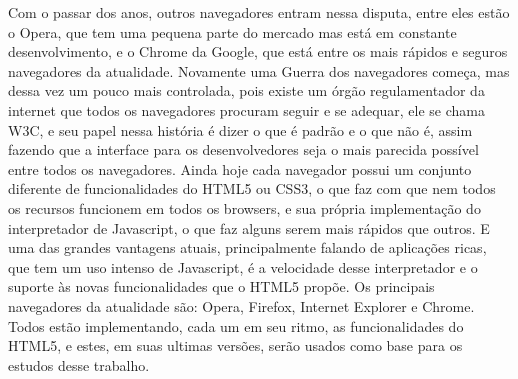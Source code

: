 Com o passar dos anos, outros navegadores entram nessa disputa, entre
eles estão o Opera, que tem uma pequena parte do mercado mas está em
constante desenvolvimento, e o Chrome da Google, que está entre os
mais rápidos e seguros navegadores da atualidade.
Novamente uma Guerra dos navegadores começa, mas dessa vez um pouco
mais controlada, pois existe um órgão regulamentador da internet que
todos os navegadores procuram seguir e se adequar, ele se chama W3C,
e seu papel nessa história é dizer o que
é padrão e o que não é, assim fazendo que a interface para os
desenvolvedores seja o mais parecida possível entre todos os
navegadores.
Ainda hoje cada navegador possui um conjunto diferente de funcionalidades
do HTML5 ou CSS3, o que faz com que nem todos os recursos funcionem em todos
os browsers, e sua própria implementação do
interpretador de Javascript, o que faz alguns serem mais rápidos que
outros. E uma das grandes vantagens atuais, principalmente falando de
aplicações ricas, que tem um uso intenso de Javascript, é a velocidade
desse interpretador e o suporte às novas funcionalidades que o HTML5
propõe.
Os principais navegadores da atualidade são: Opera, Firefox, Internet
Explorer e Chrome. Todos estão implementando, cada um em seu ritmo, as
funcionalidades do HTML5, e estes, em suas ultimas versões, serão usados
como base para os estudos desse trabalho.
